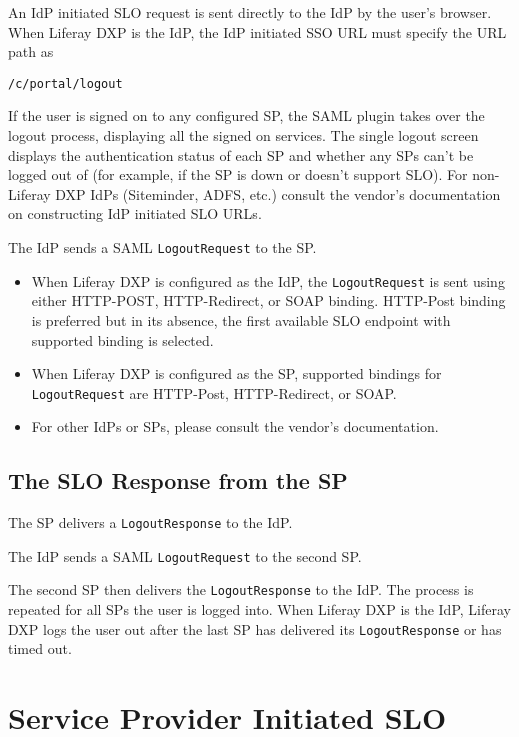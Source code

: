 An IdP initiated SLO request is sent directly to the IdP by the user's
browser. When Liferay DXP is the IdP, the IdP initiated SSO URL must
specify the URL path as

\texttt{/c/portal/logout}

If the user is signed on to any configured SP, the SAML plugin takes
over the logout process, displaying all the signed on services. The
single logout screen displays the authentication status of each SP and
whether any SPs can't be logged out of (for example, if the SP is down
or doesn't support SLO). For non-Liferay DXP IdPs (Siteminder, ADFS,
etc.) consult the vendor's documentation on constructing IdP initiated
SLO URLs.

The IdP sends a SAML \texttt{LogoutRequest} to the SP.

\begin{itemize}
\tightlist
\item
  When Liferay DXP is configured as the IdP, the \texttt{LogoutRequest}
  is sent using either HTTP-POST, HTTP-Redirect, or SOAP binding.
  HTTP-Post binding is preferred but in its absence, the first available
  SLO endpoint with supported binding is selected.
\item
  When Liferay DXP is configured as the SP, supported bindings for
  \texttt{LogoutRequest} are HTTP-Post, HTTP-Redirect, or SOAP.
\item
  For other IdPs or SPs, please consult the vendor's documentation.
\end{itemize}

\subsection{The SLO Response from the
SP}\label{the-slo-response-from-the-sp}

The SP delivers a \texttt{LogoutResponse} to the IdP.

The IdP sends a SAML \texttt{LogoutRequest} to the second SP.

The second SP then delivers the \texttt{LogoutResponse} to the IdP. The
process is repeated for all SPs the user is logged into. When Liferay
DXP is the IdP, Liferay DXP logs the user out after the last SP has
delivered its \texttt{LogoutResponse} or has timed out.

\section{Service Provider Initiated
SLO}\label{service-provider-initiated-slo}

